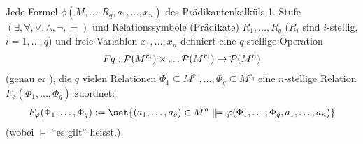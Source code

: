 \begin{remark}\label{sec4:rem:oper_rela}
	Jede Formel $\phi(M, \dots,R_q, a_1, \dots, x_n)$ des Prädikantenkalküls 1. Stufe $(\exists, \forall, \vee, \wedge, \neg,=)$ und Relationssymbole (Prädikate) $R_1, \dots, R_q$ ($R_i$ sind $i$-stellig, $i = 1, \dots, q$) und freie Variablen $x_1, \dots, x_n$ definiert eine $q$-stellige Operation
	\begin{align*}
		Fq: \mathcal{P}(M^{r_i}) \times \dots \mathcal{P}(M^{r_i}) \to \mathcal{P}(M^n)
	\end{align*}
	(genau er ), die $q$ vielen Relationen $\Phi_1 \subseteq M^{r_1}, \dots , \Phi_g\subseteq M^{r_q}$ eine $n$-stellige Relation $F_{\phi}(\Phi_1,\dots,\Phi_q)$ zuordnet:
	\begin{align*}
		F_{\phi}(\Phi_1, \dots, \Phi_q) := \set{(a_1, \dots, a_q) \in M^n \mid \models \phi(\Phi_1, \dots, \Phi_q, a_1, \dots, a_n)}
	\end{align*}
	(wobei $\models$ ``es gilt'' heisst.)
\end{remark}
